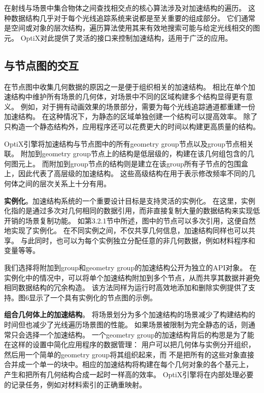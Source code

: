 在射线与场景中集合物体之间查找相交点的核心算法涉及对加速结构的遍历。
这种数据结构几乎对于每个光线追踪系统来说都是至关重要的组成部分。
它们通常是空间或对象的层次结构，遍历算法使用其来有效地搜索可能与给定光线相交的图元。 
OptiX对此提供了灵活的接口来控制加速结构，适用于广泛的应用。

\subsection{与节点图的交互}

在节点图中收集几何数据的原因之一是便于组织相关的加速结构。
相比在单个加速结构中维护所有场景的几何体，对场景中不同的区域构建多个结构显得更有意义。
例如，对于拥有动画效果的场景部分，需要为每个光线追踪通道都重建一份加速结构。
在这种情况下，为静态的区域单独创建一个结构可以提高效率。
除了只构造一个静态结构外，应用程序还可以花费更大的时间以构建更高质量的结构。

OptiX引擎将加速结构与节点图中的所有geometry group节点以及group节点相关联。
附加到geometry group节点上的结构是低层级的，构建在该几何组包含的几何图元上。
而附加到group节点的结构则是建立在该group所有子节点的包围盒上，因此代表了高层级的加速结构。
这些高级结构在用于表示修改频率不同的几何体之间的层次关系上十分有用。

\textbf{实例化}。加速结构系统的一个重要设计目标是支持灵活的实例化。
在这里，实例化指的是通过多次对几何相同的数据引用，而非直接复制大量的数据结构来实现低开销的场景复制功能。
如第3.2.1节中所述，图中的节点可以多次引用，这便自然地实现了实例化。
在不同实例之间，不仅共享几何信息，加速结构同样也可以共享。
与此同时，也可以为每个实例独立分配任意的非几何数据，例如材料程序和变量等等。

我们选择将附加到group和geometry group的加速结构公开为独立的API对象。
在实例化中的情况中，可以将单个加速结构附加到多个节点，从而共享其数据并避免相同数据结构的冗余构造。
该方法同样为运行时高效地添加和删除实例提供了支持。图6显示了一个具有实例化的节点图的示例。

\textbf{组合几何体上的加速结构}。
将场景划分为多个加速结构的场景减少了构建结构的时间但也减少了光线遍历场景图的性能。
如果场景被限制为完全静态的话，则通常只会选择一个加速结构。
一个geometry group的加速结构背后的构思是为了能在这样的设置中简化应用程序的数据管理：
用户可以把几何体与实例分开组织，然后用一个简单的geometry group将其组织起来，而
不是把所有的这些对象直接合并成一个单一的块中。相应的加速结构将构建在每个几何对象的各个基元上，
产生和把所有几何结构合成一起时一样高的效率。 
OptiX引擎将在内部处理必要的记录任务，例如对材料索引的正确重映射。

